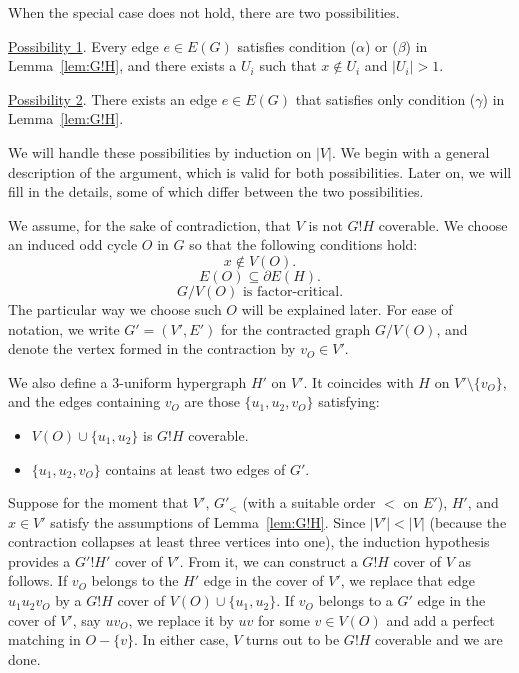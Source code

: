 \documentclass[10pt,a4paper]{amsart}
\begin{document}
When the special case does not hold, there are two possibilities.

\vspace{5pt}

\noindent \underline{Possibility 1}. Every edge $e \in E(G)$ satisfies condition ($\alpha$) or ($\beta$) in Lemma~\ref{lem:G!H}, and there exists a $U_i$ such that $x \notin U_i$ and $|U_i| > 1$.

\vspace{5pt}

\noindent \underline{Possibility 2}. There exists an edge $e \in E(G)$ that satisfies only condition ($\gamma$) in Lemma~\ref{lem:G!H}.

\vspace{5pt}

We will handle these possibilities by induction on $|V|$. We begin with a general description of the argument, which is valid for both possibilities. Later on, we will fill in the details, some of which differ between the two possibilities.

We assume, for the sake of contradiction, that $V$ is not $G!H$ coverable. We choose an induced odd cycle $O$ in $G$ so that the following conditions hold:
\begin{equation} \label{eq:noxo}
x \notin V(O).
\end{equation}
\begin{equation} \label{eq:osh}
E(O) \subseteq \partial E(H).
\end{equation}
\begin{equation} \label{eq:cfc}
G/V(O) \textrm{ is factor-critical}.
\end{equation}
The particular way we choose such $O$ will be explained later. For ease of notation, we write $G' = (V', E')$ for the contracted graph $G/V(O)$, and denote the vertex formed in the contraction by $v_O \in V'$.

We also define a $3$-uniform hypergraph $H'$ on $V'$. It coincides with $H$ on $V' \setminus \{v_O\}$, and the edges containing $v_O$ are those $\{u_1, u_2, v_O\}$ satisfying:
\begin{itemize}
    \item[-] $V(O) \cup \{u_1, u_2\}$ is $G!H$ coverable.
    \item[-] $\{ u_1, u_2, v_O\}$ contains at least two edges of $G'$.
\end{itemize}

Suppose for the moment that $V'$, $G'_<$ (with a suitable order $<$ on $E'$), $H'$, and $x \in V'$ satisfy the assumptions of Lemma~\ref{lem:G!H}. Since $|V'| < |V|$ (because the contraction collapses at least three vertices into one), the induction hypothesis provides a $G'!H'$ cover of $V'$. From it, we can construct a $G!H$ cover of $V$ as follows. If $v_O$ belongs to the $H'$ edge in the cover of $V'$, we replace that edge $u_1u_2v_O$ by a $G!H$ cover of $V(O) \cup \{u_1, u_2\}$. If $v_O$ belongs to a $G'$ edge in the cover of $V'$, say $uv_O$, we replace it by $uv$ for some $v \in V(O)$ and add a perfect matching in $O - \{v\}$. In either case, $V$ turns out to be $G!H$ coverable and we are done.
\end{document}
